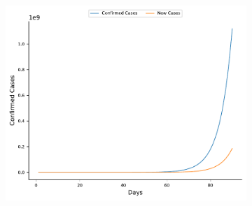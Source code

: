 \documentclass[12pt, twosided]{report}  %
\begin{document}
\begin{figure}[H]
\centering

	\begin{subfigure}[b]{0.5\textwidth}
		\includegraphics[width=\textwidth]{./images/plot_11.pdf}
		\label{plot_sustained}
	\end{subfigure}


\end{figure}
\end{document}
